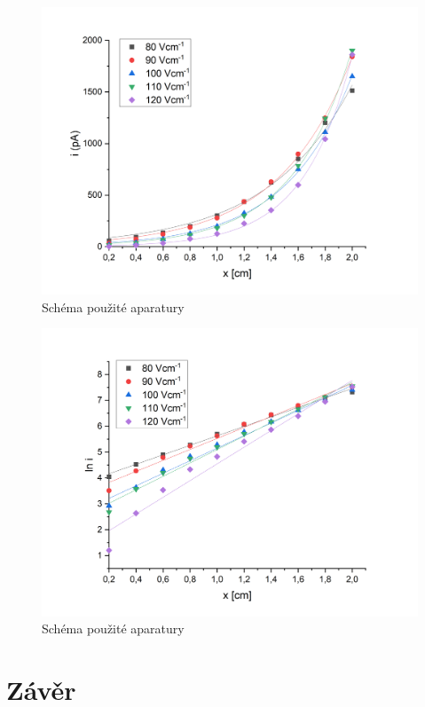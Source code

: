 \documentclass[a4paper,12pt]{article}
\begin{document}
\begin{figure}[h]
	\centering
	\includegraphics[width=130mm]{ifx.png}
	\caption{Schéma použité aparatury}
	\label{ifx}
\end{figure}

\begin{figure}[h]
	\centering
	\includegraphics[width=130mm]{lni.png}
	\caption{Schéma použité aparatury}
	\label{lni}
\end{figure}


\section{Závěr}
\end{document}
